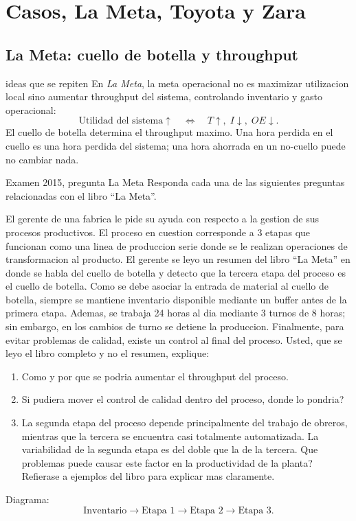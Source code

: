 \section{Casos, La Meta, Toyota y Zara}

\subsection{La Meta: cuello de botella y throughput}

\begin{materia}{ideas que se repiten}
En \emph{La Meta}, la meta operacional no es maximizar utilizacion local sino aumentar throughput del sistema, controlando inventario y gasto operacional:
\[
  \text{Utilidad del sistema} \uparrow
  \quad \Leftrightarrow \quad
  T \uparrow,\; I \downarrow,\; OE \downarrow.
\]
El cuello de botella determina el throughput maximo. Una hora perdida en el cuello es una hora perdida del sistema; una hora ahorrada en un no-cuello puede no cambiar nada.
\end{materia}

\begin{enunciado}{Examen 2015, pregunta La Meta}
Responda cada una de las siguientes preguntas relacionadas con el libro ``La Meta''.

El gerente de una fabrica le pide su ayuda con respecto a la gestion de sus procesos productivos. El proceso en cuestion corresponde a 3 etapas que funcionan como una linea de produccion serie donde se le realizan operaciones de transformacion al producto. El gerente se leyo un resumen del libro ``La Meta'' en donde se habla del cuello de botella y detecto que la tercera etapa del proceso es el cuello de botella. Como se debe asociar la entrada de material al cuello de botella, siempre se mantiene inventario disponible mediante un buffer antes de la primera etapa. Ademas, se trabaja 24 horas al dia mediante 3 turnos de 8 horas; sin embargo, en los cambios de turno se detiene la produccion. Finalmente, para evitar problemas de calidad, existe un control al final del proceso. Usted, que se leyo el libro completo y no el resumen, explique:

\begin{enumerate}[label=\alph*)]
  \item Como y por que se podria aumentar el throughput del proceso.
  \item Si pudiera mover el control de calidad dentro del proceso, donde lo pondria?
  \item La segunda etapa del proceso depende principalmente del trabajo de obreros, mientras que la tercera se encuentra casi totalmente automatizada. La variabilidad de la segunda etapa es del doble que la de la tercera. Que problemas puede causar este factor en la productividad de la planta? Refierase a ejemplos del libro para explicar mas claramente.
\end{enumerate}

Diagrama:
\[
  \text{Inventario}\rightarrow \text{Etapa 1}\rightarrow \text{Etapa 2}\rightarrow \text{Etapa 3}.
\]
\end{enunciado}


